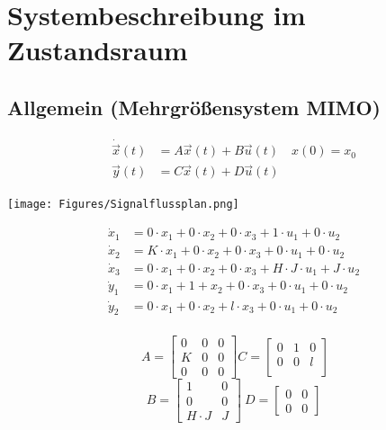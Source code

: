 \documentclass[10pt,a4paper]{article}
\begin{document}
\section{Systembeschreibung im Zustandsraum}
\subsection{Allgemein (Mehrgrößensystem MIMO) }
\begin{mdframed}[style=exercise]
	\vspace{-1em}
	\begin{align*}
		\dot{\Vec{x}}(t) & = A\vec{x}(t) + B\vec{u}(t) \quad x(0) = x_{0} \\
		\vec{y}(t)       & = C\vec{x}(t) + D\vec{u}(t)
	\end{align*}
\end{mdframed}

\begin{center}
	\texttt{[image: Figures/Signalflussplan.png]}
\end{center}

\begin{mdframed}[style=exercise]
	\begin{align*}
		\dot{x}_{1} & = 0\cdot x_{1} +0\cdot x_{2} +0\cdot x_{3} +1\cdot u_{1}+0\cdot u_{2}        \\
		\dot{x}_{2} & = K\cdot x_{1} +0\cdot x_{2} +0\cdot x_{3} +0\cdot u_{1}+0\cdot u_{2}        \\
		\dot{x}_{3} & = 0\cdot x_{1} +0\cdot x_{2} +0\cdot x_{3} +H\cdot J\cdot u_{1}+J\cdot u_{2} \\
		\dot{y}_{1} & = 0\cdot x_{1} +1+x_{2} +0\cdot x_{3} +0\cdot u_{1}+0\cdot u_{2}             \\
		\dot{y}_{2} & = 0\cdot x_{1} +0\cdot x_{2} +l\cdot x_{3} +0\cdot u_{1}+0\cdot u_{2}        \\
	\end{align*}
\end{mdframed}

\begin{mdframed}[style=exercise]
	\[
		\ A = \begin{bmatrix}
			0 & 0 & 0 \\
			K & 0 & 0 \\
			0 & 0 & 0
		\end{bmatrix}
		C = \begin{bmatrix}
			0 & 1 & 0 \\
			0 & 0 & l \\
		\end{bmatrix}\]
	\[B = \begin{bmatrix}
			1         & 0 \\
			0         & 0 \\
			H\cdot{}J & J
		\end{bmatrix} \
		D = \begin{bmatrix}
			0 & 0 \\
			0 & 0
		\end{bmatrix}
	\]

\end{mdframed}
\end{document}
